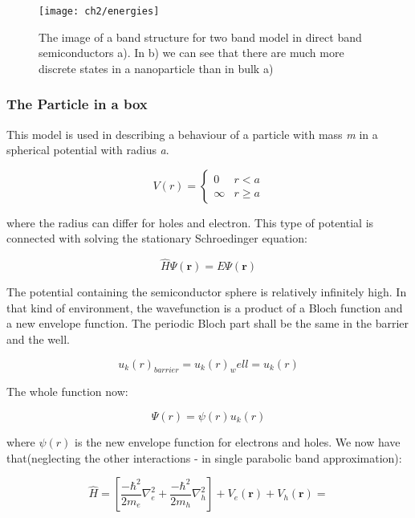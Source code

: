 \begin{figure}
\centering
\texttt{[image: ch2/energies]}
\caption{The image of a band structure for two band model in direct band semiconductors a). In b) we can see that there are much more discrete states in a nanoparticle than in bulk a) \cite{Klimov}}
\end{figure}


\subsubsection{The Particle in a box}

This model is used in describing a behaviour of a particle with mass \textit{m} in a spherical potential with radius \textit{a}. \cite{Klimov} 

\[ V(r) = 
 \begin{cases}
 0  & r < a \\
 \infty & r \geq a
 \end{cases}
\]

where the radius can differ for holes and electron. This type of potential is connected with solving the stationary Schroedinger equation:

\begin{equation}
\hat{H}\Psi (\mathbf{r}) =  E\Psi (\mathbf{r})
\end{equation}

The potential containing the semiconductor sphere is relatively infinitely high. In that kind of environment, the wavefunction is a product of a Bloch function and a new envelope function. The periodic Bloch part shall be the same in the barrier and the well. 

\begin{equation}
u_k(r)_{barrier} = u_k(r)_well = u_k(r)
\end{equation}

The whole function now:

\begin{equation}
\Psi (r) = \psi (r) u_k(r)
\end{equation}

where $\psi(r)$ is the new envelope function for electrons and holes. We now have that(neglecting the other interactions - in single parabolic band approximation):

\begin{equation}
\hat{H} = \left[ \frac{-\hbar ^2}{2m_e}\nabla _e^2 + \frac{-\hbar ^2}{2m_h}\nabla _h^2 \right] + V_e(\mathbf{r}) + V_h(\mathbf{r}) =
\end{equation}

